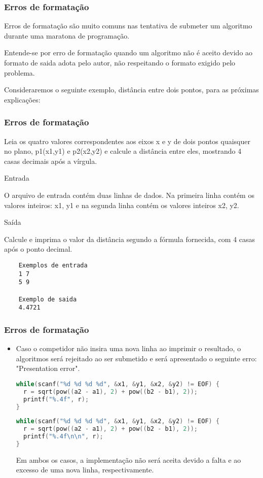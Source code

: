 \begin{frame}
 \frametitle{Erros de formatação}
 Erros de formatação são muito comuns nas tentativa de submeter um algoritmo durante uma maratona de programação.
 
 Entende-se por erro de formatação quando um algoritmo não é aceito devido ao formato de saida adota pelo autor, não respeitando o formato exigido pelo problema.
 
 Consideraremos o seguinte exemplo, distância entre dois pontos, para as próximas explicações:
\end{frame}

\begin{frame} [fragile]
\frametitle{Erros de formatação}
\small Leia os quatro valores correspondentes aos eixos x e y de dois pontos quaisquer no plano, p1(x1,y1) e p2(x2,y2) e calcule a distância entre eles, mostrando 4 casas decimais após a vírgula.
  \begin{center}
Entrada
  \end{center}
\small O arquivo de entrada contém duas linhas de dados. Na primeira linha contém os valores inteiros: x1, y1 e na segunda linha contém os valores inteiros x2, y2.
  \begin{center}
Saída
  \end{center}
Calcule e imprima o valor da distância segundo a fórmula fornecida, com 4 casas após o ponto decimal.
  \begin{lstlisting}
    Exemplos de entrada
    1 7
    5 9

    Exemplo de saida
    4.4721
  \end{lstlisting}
\end{frame}

\begin{frame} [fragile]
 \frametitle{Erros de formatação}
 \begin{itemize}
  \item Caso o competidor não insira uma nova linha ao imprimir o resultado, o algoritmos será rejeitado ao ser submetido e será apresentado o seguinte erro: "Presentation error".
  \begin{lstlisting}[language=c]
while(scanf("%d %d %d %d", &x1, &y1, &x2, &y2) != EOF) {
  r = sqrt(pow((a2 - a1), 2) + pow((b2 - b1), 2));
  printf("%.4f", r);
}  
  \end{lstlisting}
  \begin{lstlisting}[language=c]
while(scanf("%d %d %d %d", &x1, &y1, &x2, &y2) != EOF) {
  r = sqrt(pow((a2 - a1), 2) + pow((b2 - b1), 2));
  printf("%.4f\n\n", r);
}  
  \end{lstlisting}
  Em ambos os casos, a implementação não será aceita devido a falta e ao excesso de uma nova linha, respectivamente.
 \end{itemize}
\end{frame}

